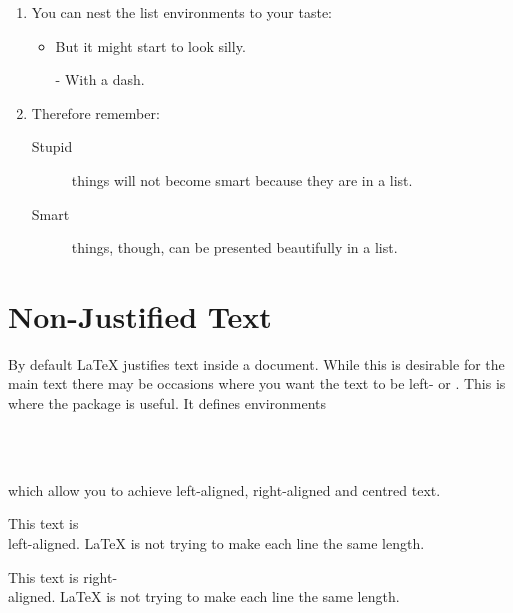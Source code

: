 \begin{example}
\begin{enumerate}
\item You can nest the list
environments to your taste:
\begin{itemize}
\item But it might start to
look silly.
\item[-] With a dash.
\end{itemize}
\item Therefore remember:
\begin{description}
\item[Stupid] things will not
become smart because they are
in a list.
\item[Smart] things, though,
can be presented beautifully
in a list.
\end{description}
\end{enumerate}
\end{example}

\section{Non-Justified Text}\label{sec:ragged}

By default \LaTeX{} justifies text inside a document. While this is desirable
for the main text there may be occasions where you want the text to be left- or
. This is where the 
package is useful. It defines environments
\begin{lscommand}
   \\
   \\
\end{lscommand}
which allow you to achieve left-aligned, right-aligned and centred text.

\begin{example}
\begin{FlushLeft}
  This text is\\ left-aligned.
  \LaTeX{} is not trying to make
  each line the same length.
\end{FlushLeft}
\end{example}

\begin{example}
\begin{FlushRight}
  This text is right-\\aligned.
  \LaTeX{} is not trying to make
  each line the same length.
\end{FlushRight}
\end{example}

